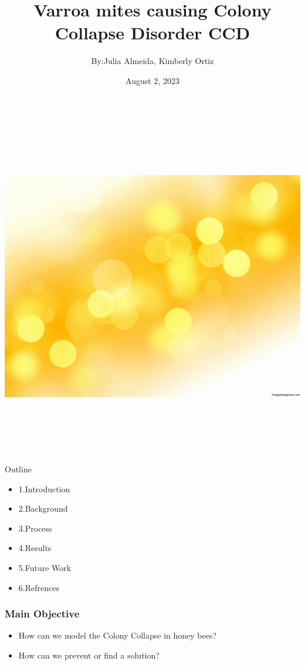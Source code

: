 \documentclass{beamer}
\title{Varroa mites causing Colony Collapse Disorder CCD}
\author{By:Julia Almeida, Kimberly Ortiz}
\institute{Institue for Computing in Research}
\date{August 2, 2023}
\begin{document}
{
\includegraphics[width=20cm, height=15cm]{mites.jpg}
}

\begin{frame}
  \titlepage
\end{frame}

\begin{frame}{Outline}{\large}
\begin{itemize}
    \item 1.Introduction
    \item 2.Background
    \item 3.Process
    \item 4.Results
    \item 5.Future Work
    \item 6.Refrences
\end{itemize}
\end{frame}

\begin{frame}
  \frametitle{Main Objective}
  \begin{itemize}
  \item How can we model the Colony Collapse in honey bees?
  \item How can we prevent or find a solution?
  \end{itemize}
\end{frame}
\end{document}

